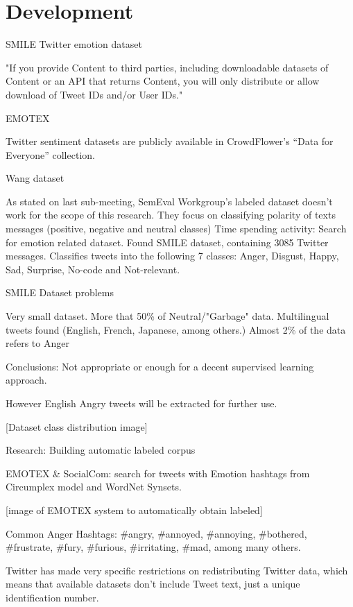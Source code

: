 \chapter{Development}

SMILE Twitter emotion dataset\cite{wang2016smile}

"If you provide Content to third parties, including downloadable datasets of Content or an API that returns Content, you will only distribute or allow download of Tweet IDs and/or User IDs."\cite{twitterTOS}

EMOTEX\cite{hasan2014emotex} 

Twitter sentiment datasets are publicly available in CrowdFlower's ``Data for Everyone'' collection\cite{CrowdFlowerDfE}.

Wang dataset\cite{wang2012harnessing}

As stated on last sub-meeting, SemEval Workgroup's\cite{SemEvalPortal} labeled dataset doesn't work for the scope of this research. They focus on classifying polarity of texts messages (positive, negative and neutral classes) 
Time spending activity: Search for emotion related dataset.
 Found SMILE dataset, containing 3085 Twitter messages.
Classifies tweets into the following 7 classes: Anger, Disgust, Happy, Sad, Surprise, No-code and Not-relevant.

SMILE Dataset problems

Very small dataset.
More that 50\% of Neutral/"Garbage" data.
Multilingual tweets found (English, French, Japanese, among others.)
Almost 2\% of the data refers to Anger

Conclusions:
Not appropriate or enough for a decent supervised learning approach.

However English Angry tweets will be extracted for further use.

[Dataset class distribution image]

Research: Building automatic labeled corpus

EMOTEX \& SocialCom: search for tweets with Emotion hashtags from Circumplex model and WordNet Synsets.

[image of EMOTEX system to automatically obtain labeled]

Common Anger Hashtags:
\#angry, \#annoyed, \#annoying, \#bothered, \#frustrate, \#fury, \#furious, \#irritating, \#mad, among many others.

Twitter has made very specific restrictions on redistributing Twitter data, which means that available datasets don't include Tweet text, just a unique identification number.

